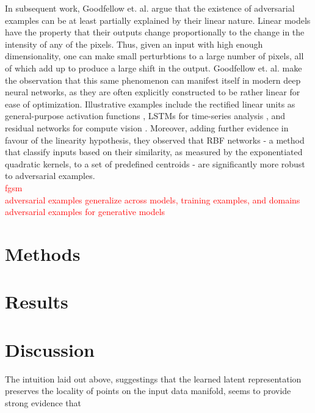 \documentclass{report}
\newcommand\todo[1]{\textcolor{red}{#1}}
\begin{document}
\bigskip

\noindent In subsequent work, Goodfellow et. al. \cite{explaining-and-harnessing} argue that the existence of adversarial examples can be at least partially explained by their linear nature. Linear models have the property that their outputs change proportionally to the change in the intensity of any of the pixels. Thus, given an input with high enough dimensionality, one can make small perturbtions to a large number of pixels, all of which add up to produce a large shift in the output. Goodfellow et. al. make the observation that this same phenomenon can manifest itself in modern deep neural networks, as they are often explicitly constructed to be rather linear for ease of optimization. Illustrative examples include the rectified linear units as general-purpose activation functions \cite{relu}, LSTMs for time-series analysis \cite{lstm}, and residual networks for compute vision \cite{resnet}. Moreover, adding further evidence in favour of the linearity hypothesis, they observed that RBF networks \cite{rbf-networks} - a method that classify inputs based on their similarity, as measured by the exponentiated quadratic kernels, to a set of predefined centroids - are significantly more robust to adversarial examples. \\

\noindent \todo{fgsm} \\

\noindent \todo{adversarial examples generalize across models, training examples, and domains} \\

\noindent \todo{adversarial examples for generative models}

\chapter{Methods}

\chapter{Results}

\chapter{Discussion}

The intuition laid out above, suggestings that the learned latent representation preserves the locality of points on the input data manifold, seems to provide strong evidence that 
\end{document}
